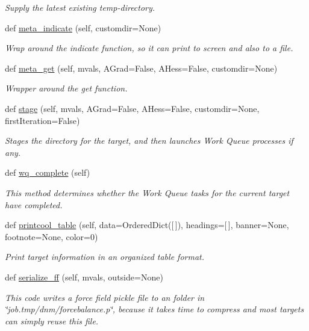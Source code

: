 \begin{DoxyCompactItemize}
\begin{DoxyCompactList}\small\item\em Supply the latest existing temp-\/directory. \end{DoxyCompactList}\item 
def \hyperlink{classsrc_1_1target_1_1Target_a75dc5c4428df625f265e481f61718ec1}{meta\+\_\+indicate} (self, customdir=None)
\begin{DoxyCompactList}\small\item\em Wrap around the indicate function, so it can print to screen and also to a file. \end{DoxyCompactList}\item 
def \hyperlink{classsrc_1_1target_1_1Target_a14ccb9a63ebc92a83ead58965f13fcc7}{meta\+\_\+get} (self, mvals, A\+Grad=False, A\+Hess=False, customdir=None)
\begin{DoxyCompactList}\small\item\em Wrapper around the get function. \end{DoxyCompactList}\item 
def \hyperlink{classsrc_1_1target_1_1Target_af543ca7235b5112aa29018ffa7bc1e1c}{stage} (self, mvals, A\+Grad=False, A\+Hess=False, customdir=None, first\+Iteration=False)
\begin{DoxyCompactList}\small\item\em Stages the directory for the target, and then launches Work Queue processes if any. \end{DoxyCompactList}\item 
def \hyperlink{classsrc_1_1target_1_1Target_aeb7582896efcfe1d0316a4ee80fc5634}{wq\+\_\+complete} (self)
\begin{DoxyCompactList}\small\item\em This method determines whether the Work Queue tasks for the current target have completed. \end{DoxyCompactList}\item 
def \hyperlink{classsrc_1_1target_1_1Target_aa6d59de5918c58d75a9f23eb1c5bff39}{printcool\+\_\+table} (self, data=Ordered\+Dict(\mbox{[}$\,$\mbox{]}), headings=\mbox{[}$\,$\mbox{]}, banner=None, footnote=None, color=0)
\begin{DoxyCompactList}\small\item\em Print target information in an organized table format. \end{DoxyCompactList}\item 
def \hyperlink{classsrc_1_1target_1_1Target_a8d05de21b2477b71aa74ea001f4d62b5}{serialize\+\_\+ff} (self, mvals, outside=None)
\begin{DoxyCompactList}\small\item\em This code writes a force field pickle file to an folder in \char`\"{}job.\+tmp/dnm/forcebalance.\+p\char`\"{}, because it takes time to compress and most targets can simply reuse this file. \end{DoxyCompactList}\end{DoxyCompactItemize}
